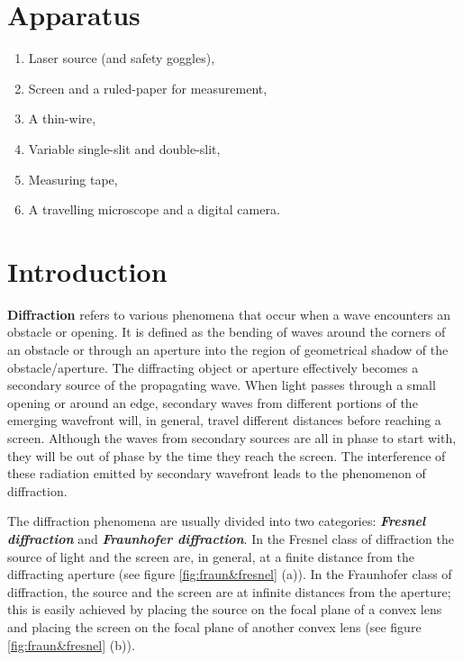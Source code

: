 \documentclass{article}
\begin{document}
\section{Apparatus}
\begin{enumerate}
    \item Laser source (and safety goggles),
    \item Screen and a ruled-paper for measurement,
    \item A thin-wire,
    \item Variable single-slit and double-slit,
    \item Measuring tape,
    \item A travelling microscope and a digital camera.
\end{enumerate}

\section{Introduction}
\noindent \textbf{Diffraction} refers to various phenomena that occur when a wave encounters an obstacle or opening. It is defined as the bending of waves around the corners of an obstacle or through an aperture into the region of geometrical shadow of the obstacle/aperture. The diffracting object or aperture effectively becomes a secondary source of the propagating wave. When light passes through a small opening or around an edge, secondary waves from different portions of the emerging wavefront will, in general, travel different distances before reaching a screen. Although the waves from secondary sources are all in phase to start with, they will be out of phase by the time they reach the screen. The interference of these radiation emitted by secondary wavefront leads to the phenomenon of diffraction.
\par
\noindent
The diffraction phenomena are usually divided into two categories: \textbf{\textit{Fresnel diffraction}} and \textbf{\textit{Fraunhofer diffraction}}. In the Fresnel class of diffraction the source of light and the screen are, in general, at a finite distance from the diffracting aperture (see figure \ref{fig:fraun&fresnel} (a)). In the Fraunhofer class of diffraction, the source and the screen are at infinite distances from the aperture; this is easily achieved by placing the source on the focal plane of a convex lens and placing the screen on the focal plane of another convex lens (see figure \ref{fig:fraun&fresnel} (b)).
\clearpage
\end{document}
